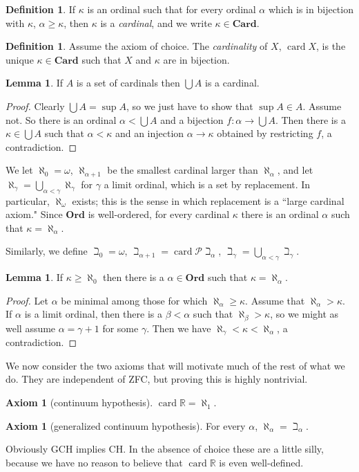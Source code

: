 \documentclass[12pt]{report}
\newcommand{\RR}{\mathbb{R}}
\newcommand{\card}{\operatorname{card}}
\newcommand{\pset}{\mathcal{P}}
\newcommand{\Card}{\mathbf{Card}}
\newcommand{\Ord}{\mathbf{Ord}}
\newcommand{\dfn}[1]{\emph{#1}\index{#1}}
\theoremstyle{definition}
\newtheorem{lemma}[theorem]{Lemma}
\newtheorem{axiom}[theorem]{Axiom}
\newtheorem{definition}[theorem]{Definition}
\begin{document}
\begin{definition}
    If $\kappa$ is an ordinal such that for every ordinal $\alpha$ which is in bijection with $\kappa$, $\alpha \geq \kappa$, then $\kappa$ is a \dfn{cardinal}, and we write $\kappa \in \Card$.
\end{definition}
\begin{definition}
    Assume the axiom of choice. The \dfn{cardinality} of $X$, $\card X$, is the unique $\kappa \in \Card$ such that $X$ and $\kappa$ are in bijection.
\end{definition}
\begin{lemma}
    If $A$ is a set of cardinals then $\bigcup A$ is a cardinal.
\end{lemma}
\begin{proof}
    Clearly $\bigcup A = \sup A$, so we just have to show that $\sup A \in A$. Assume not. So there is an ordinal $\alpha < \bigcup A$ and a bijection $f: \alpha \to \bigcup A$. Then there is a $\kappa \in \bigcup A$ such that $\alpha < \kappa$ and an injection $\alpha \to \kappa$ obtained by restricting $f$, a contradiction.
\end{proof}
    We let $\aleph_0 = \omega$, $\aleph_{\alpha + 1}$ be the smallest cardinal larger than $\aleph_\alpha$, and let $\aleph_\gamma = \bigcup_{\alpha < \gamma} \aleph_\gamma$ for $\gamma$ a limit ordinal, which is a set by replacement. In particular, $\aleph_\omega$ exists; this is the sense in which replacement is a ``large cardinal axiom."
    Since $\Ord$ is well-ordered, for every cardinal $\kappa$ there is an ordinal $\alpha$ such that $\kappa = \aleph_\alpha$.

    Similarly, we define $\beth_0 = \omega$, $\beth_{\alpha + 1} = \card \pset \beth_\alpha$, $\beth_\gamma = \bigcup_{\alpha < \gamma} \beth_\gamma$.
\begin{lemma}
    If $\kappa \geq \aleph_0$ then there is a $\alpha \in \Ord$ such that $\kappa = \aleph_\alpha$.
\end{lemma}
\begin{proof}
    Let $\alpha$ be minimal among those for which $\aleph_\alpha \geq \kappa$. Assume that $\aleph_\alpha > \kappa$. If $\alpha$ is a limit ordinal, then there is a $\beta < \alpha$ such that $\aleph_\beta > \kappa$, so we might as well assume $\alpha = \gamma + 1$ for some $\gamma$. Then we have $\aleph_\gamma < \kappa < \aleph_\alpha$, a contradiction.
\end{proof}

We now consider the two axioms that will motivate much of the rest of what we do. They are independent of ZFC, but proving this is highly nontrivial.
\begin{axiom}[continuum hypothesis]
    $\card \RR = \aleph_1$.
\end{axiom}
\begin{axiom}[generalized continuum hypothesis]
    For every $\alpha$, $\aleph_\alpha = \beth_\alpha$.
\end{axiom}
Obviously GCH implies CH. In the absence of choice these are a little silly, because we have no reason to believe that $\card \RR$ is even well-defined.
\end{document}
